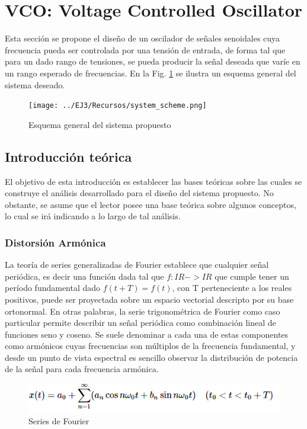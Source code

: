 \section{VCO: Voltage Controlled Oscillator}
Esta secci\'on se propone el dise\~no de un oscilador de se\~nales senoidales cuya frecuencia pueda ser controlada por una tensi\'on de entrada,
de forma tal que para un dado rango de tensiones, se pueda producir la se\~nal deseada que var\'ie en un rango esperado de frecuencias.
En la Fig. \ref{fig:esquema_general_ejercicio_3} se ilustra un esquema general del sistema deseado.

\begin{figure}[H]
    \centering
    \texttt{[image: ../EJ3/Recursos/system\_scheme.png]}
    \caption{Esquema general del sistema propuesto}
    \label{fig:esquema_general_ejercicio_3}
\end{figure}


\subsection{Introducci\'on te\'orica}
El objetivo de esta introducci\'on es establecer las bases te\'oricas sobre las cuales se construye
el an\'alisis desarrollado para el dise\~no del sistema propuesto. No obstante, se asume que el lector posee
una base te\'orica sobre algunos conceptos, lo cual se ir\'a indicando a lo largo de tal an\'alisis.

\subsubsection{Distorsi\'on Arm\'onica}
La teor\'ia de series generalizadas de Fourier establece que cualquier se\~nal peri\'odica, es decir una funci\'on dada tal que
$f: I\!R -> I\!R$ que cumple tener un per\'iodo fundamental dado $f(t + T) = f(t)$, con T perteneciente a los reales positivos, puede
ser proyectada sobre un espacio vectorial descripto por su base ortonormal.
En otras palabras, la serie trigonométrica de Fourier como caso particular permite describir un se\~nal peri\'odica como combinaci\'on 
lineal de funciones seno y coseno. Se suele denominar a cada una de estas componentes como arm\'onicos cuyas frecuencias son m\'ultiplos de la 
frecuencia fundamental, y desde un punto de vista espectral es sencillo observar la distribuci\'on de potencia de la se\~nal para cada frecuencia
arm\'onica.

\begin{figure}[H]
    \centering
    \includegraphics[scale=0.6]{../EJ3/Recursos/fourier_series.PNG}
    \caption{Series de Fourier}
\end{figure}


